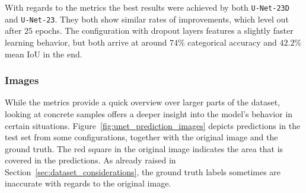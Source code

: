 With regards to the metrics the best results were achieved by both \texttt{U-Net-23D} and \texttt{U-Net-23}. They both show similar rates of improvements, which level out after $25$ epochs. The configuration with dropout layers features a slightly faster learning behavior, but both arrive at around $74\%$ categorical accuracy and $42.2\%$ mean IoU in the end.

\subsubsection{Images}
While the metrics provide a quick overview over larger parts of the dataset, looking at concrete samples offers a deeper insight into the model's behavior in certain situations. Figure~\ref{fig:unet_prediction_images} depicts predictions in the test set from some configurations, together with the original image and the ground truth. The red square in the original image indicates the area that is covered in the predictions. As already raised in Section~\ref{sec:dataset_considerations}, the ground truth labels sometimes are inaccurate with regards to the original image.

